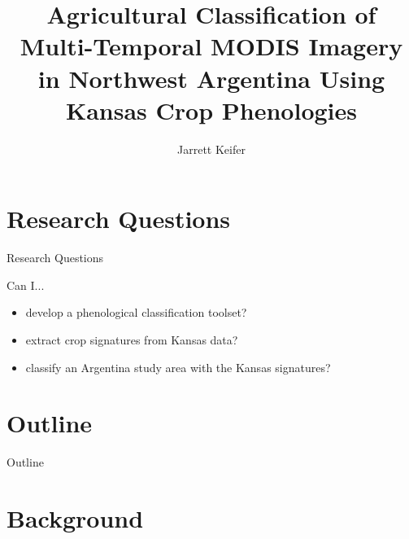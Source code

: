 \documentclass[draft,compress]{beamer}
\title{Agricultural Classification of Multi-Temporal MODIS Imagery in Northwest Argentina Using Kansas Crop Phenologies}
\subtitle{}
\date{\formatdate{17}{9}{2014}}
\author{Jarrett Keifer}
\institute{Department of Geography}%
\begin{document}

\maketitle



\section*{Research Questions}

\begin{frame}{Research Questions}

Can I...

\begin{itemize}
  \item<1-> develop a phenological classification toolset?
  \item<2-> extract crop signatures from Kansas data?
  \item<3-> classify an Argentina study area with the Kansas signatures?
\end{itemize}
\end{frame}


\section*{Outline}
\begin{frame}{Outline}
	\singlespace\tableofcontents[hideallsubsections]
\end{frame}



\section{Background}
\end{document}
